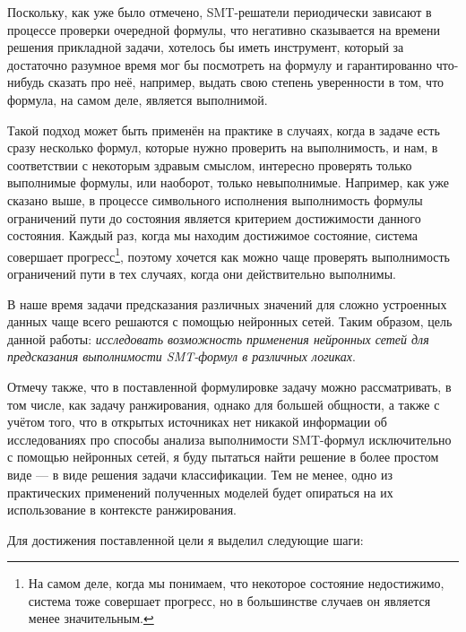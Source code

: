 
Поскольку, как уже было отмечено, SMT-решатели периодически зависают в процессе проверки очередной формулы, что негативно сказывается на времени решения прикладной задачи, хотелось бы иметь инструмент, который за достаточно разумное время мог бы посмотреть на формулу и гарантированно что-нибудь сказать про неё, например, выдать свою степень уверенности в том, что формула, на самом деле, является выполнимой.

Такой подход может быть применён на практике в случаях, когда в задаче есть сразу несколько формул, которые нужно проверить на выполнимость, и нам, в соответствии с некоторым здравым смыслом, интересно проверять только выполнимые формулы, или наоборот, только невыполнимые. Например, как уже сказано выше, в процессе символьного исполнения выполнимость формулы ограничений пути до состояния является критерием достижимости данного состояния. Каждый раз, когда мы находим достижимое состояние, система совершает прогресс\footnote{На самом деле, когда мы понимаем, что некоторое состояние недостижимо, система тоже совершает прогресс, но в большинстве случаев он является менее значительным.}, поэтому хочется как можно чаще проверять выполнимость ограничений пути в тех случаях, когда они действительно выполнимы.

В наше время задачи предсказания различных значений для сложно устроенных данных чаще всего решаются с помощью нейронных сетей. Таким образом, цель данной работы: \textit{исследовать возможность применения нейронных сетей для предсказания выполнимости SMT-формул в различных логиках}.

Отмечу также, что в поставленной формулировке задачу можно рассматривать, в том числе, как задачу ранжирования, однако для большей общности, а также с учётом того, что в открытых источниках нет никакой информации об исследованиях про способы анализа выполнимости SMT-формул исключительно с помощью нейронных сетей, я буду пытаться найти решение в более простом виде --- в виде решения задачи классификации. Тем не менее, одно из практических применений полученных моделей будет опираться на их использование в контексте ранжирования.

Для достижения поставленной цели я выделил следующие шаги:

